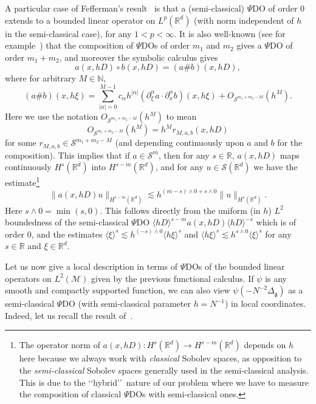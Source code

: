 \documentclass[AHL,Unicode,longabstracts,published]{cedram}
\newcommand{\R}{\mathbb{R}}
\newcommand{\N}{\mathbb{N}}
\renewcommand{\S}{\mathcal{S}}
\newcommand{\M}{\mathcal{M}}
\newcommand{\g}{\mathfrak{g}}
\newcommand{\Dlg}{\Delta_{\g}}
\newcommand{\les}{\lesssim}
\newcommand{\jb}[1] {\langle #1 \rangle}
\begin{document}
A particular case of Fefferman's result~\cite{F} is that a (semi-classical) $\Psi$DO of order 0 extends to a bounded linear operator on $L^p(\R^d)$ (with norm independent of $h$ in the semi-classical case), for any $1<p<\infty$. It is also well-known (see for example~\cite{Zworski}) that the composition of $\Psi$DOs of order $m_1$ and $m_2$ gives a $\Psi$DO of order $m_1+m_2$, and moreover the symbolic calculus gives
\begin{equation*}
a(x,hD)\circ b(x,hD) = (a\#b)(x,hD),
\end{equation*}
where for arbitrary $M\in\N$,
\begin{equation}\label{def-pscomp}
(a\#b)(x,h\xi)=\sum_{|\alpha|=0}^{M-1}c_\alpha h^{|\alpha|}\left(\partial_{\xi}^{\alpha}a\cdot\partial_{x}^{\alpha}b\right)(x,h\xi) + O_{\S^{m_1+m_2-M}}\left(h^M\right).
\end{equation}
Here we use the notation $O_{\S^{m_1+m_2-M}}(h^M)$ to mean
\begin{equation*}
O_{\S^{m_1+m_2-M}}(h^M)= h^Mr_{M,a,b}(x,hD)
\end{equation*}
for some $r_{M,a,b}\in \S^{m_1+m_2-M}$ (and depending continuously upon $a$ and $b$ for the composition). This implies that if $a\in\S^m$, then for any $s\in\R$, $a(x,hD)$ maps continuously $H^{s}(\R^d)$ into $H^{s-m}(\R^d)$, and for any $u\in\S(\R^d)$ we have the estimate\footnote{The operator norm of $a(x,hD): H^s(\R^d)\rightarrow H^{s-m}(\R^d)$ depends on $h$ here because we always work with \emph{classical} Sobolev spaces, as opposition to the \emph{semi-classical} Sobolev spaces generally used in the semi-classical analysis. This is due to the \lq\lq hybrid\rq\rq~nature of our problem where we have to measure the composition of classical $\Psi$DOs with semi-classical ones.}
\begin{equation}\label{estim-SCPDO}
\|a(x,hD)u\|_{H^{s-m}(\R^d)}\les h^{(m-s)\wedge 0+s\wedge 0}\|u\|_{H^s(\R^d)}.
\end{equation}
Here $s\wedge 0 = \min (s,0)$. This follows directly from the uniform (in $h$) $L^2$ boundedness of the semi-classical $\Psi$DO $\jb{hD}^{s-m}a(x,hD)\jb{hD}^{-s}$ which is of order 0, and the estimates $\jb{\xi}^s\les h^{(-s)\wedge 0}\jb{h\xi}^s$ and $\jb{h\xi}^s\les h^{s\wedge 0}\jb{\xi}^s$ for any $s\in\R$ and $\xi\in\R^d$.

Let us now give a local description in terms of $\Psi$DOs of the bounded linear operators on $L^2(\M)$ given by the previous functional calculus. If $\psi$ is any smooth and compactly supported function, we can also view $\psi(-N^{-2}\Dlg)$ as a semi-classical $\Psi$DO (with semi-classical parameter $h=N^{-1}$) in local coordinates. Indeed, let us recall the result of~\cite[Proposition~2.1]{BGT}.
\end{document}
